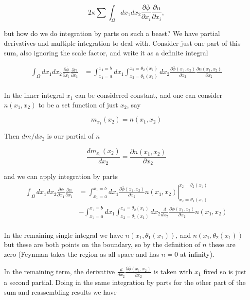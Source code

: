 \documentclass{article}
\newcommand{\PD}[2]{\frac{\partial {#2}}{\partial {#1}}}
\begin{document}
\begin{equation*}
2 \kappa \sum \int_{\Omega} dx_1 dx_2 \PD{x_i}{\bar{\phi}} \PD{x_i}{n},
\end{equation*}

but how do we do integration by parts on such a beast?  We have partial derivatives and multiple integration to deal with.  Consider just one part of this sum, also ignoring the scale factor, and write it as a definite integral

\begin{align*}
\int_{\Omega} dx_1 dx_2 \PD{x_1}{\bar{\phi}} \PD{x_1}{n}
&= \int_{x_1=a}^{x_1=b} dx_1 \int_{x_2 = \theta_1(x_1)}^{x_2 = \theta_2(x_1)} dx_2 \PD{x_2}{\bar{\phi}(x_1, x_2)} \PD{x_2}{n(x_1, x_2)} \\
\end{align*}

In the inner integral $x_1$ can be considered constant, and one can consider $n(x_1, x_2)$ to be a set function of just $x_2$, say

\begin{equation*}
m_{x_1}(x_2) = n(x_1, x_2)
\end{equation*}

Then $dm/dx_2$ is our partial of $n$

\begin{equation*}
\frac{d m_{x_1}(x_2)}{d x_2} = \PD{x_2}{n(x_1, x_2)}
\end{equation*}

and we can apply integration by parts
\begin{align*}
\int_{\Omega} dx_1 dx_2 \PD{x_1}{\bar{\phi}} \PD{x_1}{n}
&= \int_{x_1=a}^{x_1=b} dx_1
\left. \PD{x_2}{\bar{\phi}(x_1, x_2)} n(x_1, x_2) \right\vert_{x_2 = \theta_1(x_1)}^{x_2 = \theta_2(x_1)} \\
&- \int_{x_1=a}^{x_1=b} dx_1 \int_{x_2 = \theta_1(x_1)}^{x_2 = \theta_2(x_1)} dx_2 \frac{d}{dx_2} \PD{x_2}{\bar{\phi}(x_1, x_2)} n(x_1, x_2) \\
\end{align*}

In the remaining single integral we have
$n(x_1, \theta_1(x_1))$, and $n(x_1, \theta_2(x_1))$ but these are both points on the boundary, so by the definition of $n$ these are zero (Feynman takes the
region as all space and has $n=0$ at infinity).

In the remaining term, the derivative $\frac{d}{d x_2} \PD{x_2}{\bar{\phi}(x_1, x_2)}$ is taken with $x_1$ fixed so is just a second partial.
Doing in the same integration by parts for the other part of the sum and reassembling results we have
\end{document}
